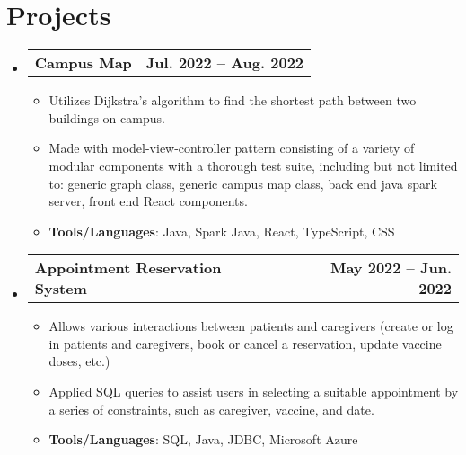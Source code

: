 \documentclass[letterpaper,11pt]{article}
\begin{document}
\section{Projects}
\begin{itemize}[nosep,label={},leftmargin=0in]

  \item
  \begin{tabularx}{\textwidth}{Xr@{}}
    \textbf{Campus Map} & \textbf{Jul. 2022 -- Aug. 2022} \\
  \end{tabularx}
  \begin{itemize}[nosep]
    \item \small{Utilizes Dijkstra's algorithm to find the shortest path between two buildings on campus.}
    \item \small{Made with model-view-controller pattern consisting of a variety of modular components with a thorough test suite, including but not limited to: generic graph class, generic campus map class, back end java spark server, front end React components.}
    \item \small{\textbf{Tools/Languages}: Java, Spark Java, React, TypeScript, CSS}
  \end{itemize}

  \item
  \begin{tabularx}{\textwidth}{Xr@{}}
    \textbf{Appointment Reservation System} & \textbf{May 2022 -- Jun. 2022} \\
  \end{tabularx}
  \begin{itemize}[nosep]
    \item \small{Allows various interactions between patients and caregivers (create or log in patients and caregivers, book or cancel a reservation, update vaccine doses, etc.)}
    \item \small{Applied SQL queries to assist users in selecting a suitable appointment by a series of constraints, such as caregiver, vaccine, and date.}
    \item \small{\textbf{Tools/Languages}: SQL, Java, JDBC, Microsoft Azure}
  \end{itemize}
  
\end{itemize}


\end{document}
